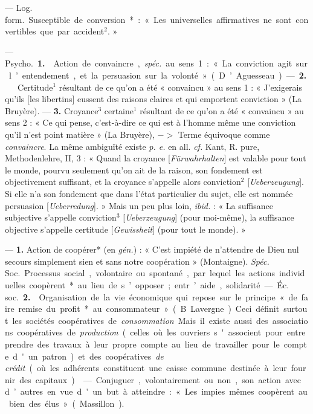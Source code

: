 \begin{itemize}[leftmargin=1cm, label=, itemsep=11pt]
 — \si{Log. form.} Susceptible de conversion* : « Les universelles
affirmatives ne sont convertibles que par accident$^2$. »

 — \si{Psycho.} {\bf 1.}  Action de
convaincre,  {\it spéc.} au sens 1 : « La
conviction agit sur l’entendement,
et la persuasion sur la volonté »
(D’Aguesseau). — {\bf 2.}   Certitude$^1$
résultant de ce qu’on a été « convaincu » au sens 1 : « J’exigerais
qu'ils [les libertins] eussent des raisons claires et qui emportent conviction » (La Bruyère). — {\bf 3.}  
Croyance$^3$ certaine$^1$ résultant de ce
qu’on a été « convaincu » au sens 2 :
« Ce qui pense, c’est-à-dire ce qui
est à l’homme même une conviction
qu’il n’est point matière » (La
Bruyère), $->$ Terme équivoque
comme {\it convaincre}. La même ambiguïté existe {\it p. e.} en all. {\it cf.} Kant,
R. pure, Methodenlehre, II, 3 :
« Quand la croyance [{\it Fürwahrhalten}] est valable pour tout le monde,
pourvu seulement qu’on ait de la
raison, son fondement est objectivement suffisant, et la croyance
s’appelle alors conviction$^2$ [{\it Ueberzeugung}]. Si elle n’a son fondement
que dans l’état particulier du sujet,
elle est nommée persuasion [{\it Ueberredung}]. » Mais un peu plus loin, {\it ibid.} :
« La suffisance subjective s'appelle
conviction$^3$ [{\it Ueberzeugung}] (pour
moi-même), la suffisance objective
s’appelle certitude [{\it Gewissheit}] (pour
tout le monde). »

 — {\bf 1.}  Action de coopérer* (en  {\it gén.}) : « C’est impiété de
n'attendre de Dieu nul secours simplement sien et sans notre coopération » (Montaigne). {\it Spéc.} \si{Soc.} Processus social, volontaire ou spontané, par lequel les actions individuelles coopèrent* au lieu de s’opposer; entr’aide, solidarité.

— \si{Éc. soc.} {\bf 2.}  Organisation de
la vie économique qui repose sur le
principe « de faire remise du profit
*au consommateur » (B. Lavergne).
Ceci définit surtout les sociétés
coopératives de {\it consommation}. Mais
il existe aussi des associations coopératives de {\it production} (celles où les
ouvriers s'associent pour entreprendre des travaux à leur propre
compte au lieu de travailler pour le
compte d'un patron) et des coopératives {\it de crédit} (où les adhérents
constituent une caisse commune
destinée à leur fournir des capitaux).

 — Conjuguer, volontairement ou non, son action avec d’autres en vue d'un but à atteindre :
« Les impies mêmes coopèrent au
bien des élus » (Massillon).


\end{itemize}
